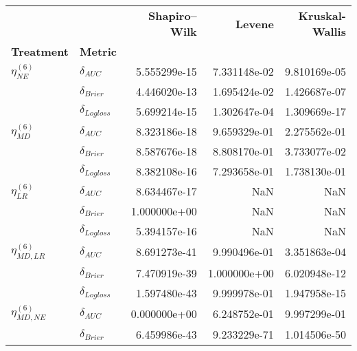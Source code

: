     
    \begin{table}[!h]
    \centering
    \begin{tabular}{l|lrrr}
    \toprule
                              &                    &  \textbf{Shapiro–Wilk} &  \textbf{Levene} &  \textbf{Kruskal-Wallis} \\
    \textbf{Treatment} & \textbf{Metric} &                        &                  &                          \\
    \midrule
    $\eta^{(6)}_{NE}$ & $\delta_{AUC}$ &           5.555299e-15 &     7.331148e-02 &             9.810169e-05 \\
                              & $\delta_{Brier}$ &           4.446020e-13 &     1.695424e-02 &             1.426687e-07 \\
                              & $\delta_{Logloss}$ &           5.699214e-15 &     1.302647e-04 &             1.309669e-17 \\
    $\eta^{(6)}_{MD}$ & $\delta_{AUC}$ &           8.323186e-18 &     9.659329e-01 &             2.275562e-01 \\
                              & $\delta_{Brier}$ &           8.587676e-18 &     8.808170e-01 &             3.733077e-02 \\
                              & $\delta_{Logloss}$ &           8.382108e-16 &     7.293658e-01 &             1.738130e-01 \\
    $\eta^{(6)}_{LR}$ & $\delta_{AUC}$ &           8.634467e-17 &              NaN &                      NaN \\
                              & $\delta_{Brier}$ &           1.000000e+00 &              NaN &                      NaN \\
                              & $\delta_{Logloss}$ &           5.394157e-16 &              NaN &                      NaN \\
    $\eta^{(6)}_{MD, LR}$ & $\delta_{AUC}$ &           8.691273e-41 &     9.990496e-01 &             3.351863e-04 \\
                              & $\delta_{Brier}$ &           7.470919e-39 &     1.000000e+00 &             6.020948e-12 \\
                              & $\delta_{Logloss}$ &           1.597480e-43 &     9.999978e-01 &             1.947958e-15 \\
    $\eta^{(6)}_{MD, NE}$ & $\delta_{AUC}$ &           0.000000e+00 &     6.248752e-01 &             9.997299e-01 \\
                              & $\delta_{Brier}$ &           6.459986e-43 &     9.233229e-71 &             1.014506e-50 \\

\end{tabular}
\end{table}

